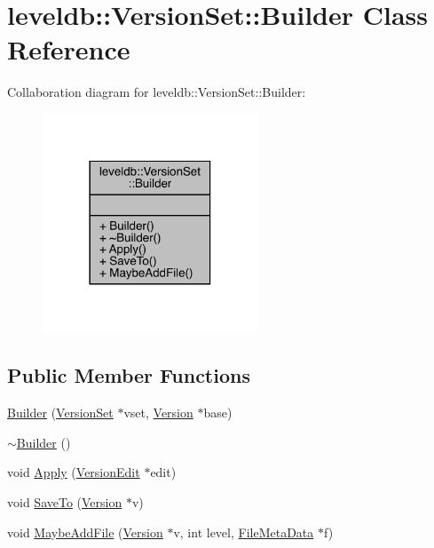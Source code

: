 \hypertarget{classleveldb_1_1_version_set_1_1_builder}{}\section{leveldb\+::Version\+Set\+::Builder Class Reference}
\label{classleveldb_1_1_version_set_1_1_builder}


Collaboration diagram for leveldb\+::Version\+Set\+::Builder\+:
\nopagebreak
\begin{figure}[H]
\begin{center}
\leavevmode
\includegraphics[width=182pt]{classleveldb_1_1_version_set_1_1_builder__coll__graph}
\end{center}
\end{figure}
\subsection*{Public Member Functions}
\begin{DoxyCompactItemize}
\item 
\mbox{\hyperlink{classleveldb_1_1_version_set_1_1_builder_a19d0dd9aec1b825e7d938e9ac24dc4f7}{Builder}} (\mbox{\hyperlink{classleveldb_1_1_version_set}{Version\+Set}} $\ast$vset, \mbox{\hyperlink{classleveldb_1_1_version}{Version}} $\ast$base)
\item 
\mbox{\hyperlink{classleveldb_1_1_version_set_1_1_builder_acd7047ca78d8c654967101f53d10792c}{$\sim$\+Builder}} ()
\item 
void \mbox{\hyperlink{classleveldb_1_1_version_set_1_1_builder_aef505b4363ebc56b8fa5deb55087993f}{Apply}} (\mbox{\hyperlink{classleveldb_1_1_version_edit}{Version\+Edit}} $\ast$edit)
\item 
void \mbox{\hyperlink{classleveldb_1_1_version_set_1_1_builder_a429b23cc022cac08ab2ba880ac5803d1}{Save\+To}} (\mbox{\hyperlink{classleveldb_1_1_version}{Version}} $\ast$v)
\item 
void \mbox{\hyperlink{classleveldb_1_1_version_set_1_1_builder_aa90e0d9d0f8e05b8bcfa879d4f4a88c6}{Maybe\+Add\+File}} (\mbox{\hyperlink{classleveldb_1_1_version}{Version}} $\ast$v, int level, \mbox{\hyperlink{structleveldb_1_1_file_meta_data}{File\+Meta\+Data}} $\ast$f)
\end{DoxyCompactItemize}


